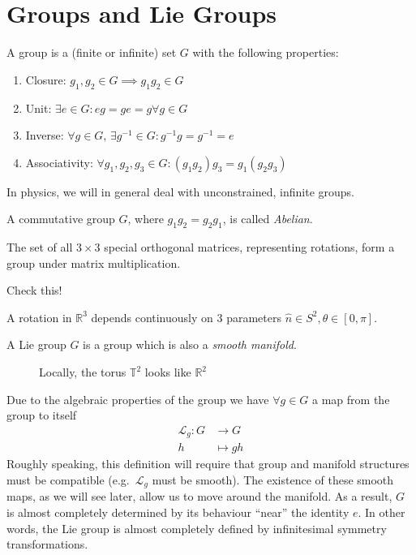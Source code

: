 \section{Groups and Lie Groups}%
\label{sec:groups_and_lie_groups}

\begin{definition}[Group]
 A group is a (finite or infinite) set $G$ with the following properties:
\begin{enumerate}
  \item Closure: $g_1, g_2 \in G \implies g_1 g_2 \in G$
  \item Unit: $\exists e \in G: eg = ge = g \forall g \in G$
  \item Inverse: $\forall g \in G$, $\exists g^{-1} \in G : g^{-1}g = g^{-1} = e$
  \item Associativity: $\forall g_1, g_2, g_3 \in G: (g_1 g_2) g_3 = g_1 (g_2 g_3)$
\end{enumerate}
\end{definition} 

In physics, we will in general deal with unconstrained, infinite groups.

\begin{definition}
A commutative group $G$, where $g_1 g_2 = g_2 g_1$, is called \emph{Abelian}.
\end{definition}

The set of all $3\times 3$ special orthogonal matrices, representing rotations, form a group under matrix multiplication.

\begin{exercise}
Check this!
\end{exercise}

A rotation in $\mathbb{R}^3$ depends continuously on 3 parameters $\hat n \in S^2, \theta \in [0, \pi]$.

\begin{definition}
A Lie group $G$ is a group which is also a \emph{smooth manifold}.
\end{definition}

\begin{figure}[htpb]
  \centering
  \def\svgwidth{0.6\columnwidth}
  
  \caption{Locally, the torus $\mathbb{T}^2$ looks like $\mathbb{R}^{2}$}
  \label{fig:l1f1}
\end{figure}

Due to the algebraic properties of the group we have $\forall g \in G$ a map from the group to itself
\begin{equation}
  \begin{split}
    \mathcal{L}_g \colon G &\to G \\
    h &\mapsto gh
  \end{split}
\end{equation}
Roughly speaking, this definition will require that group and manifold structures must be compatible (e.g.~$\mathcal{L}_{g}$ must be smooth).
The existence of these smooth maps, as we will see later, allow us to move around the manifold. As a result, $G$ is almost completely determined by its behaviour ``near'' the identity $e$.
In other words, the Lie group is almost completely defined by infinitesimal symmetry transformations.

